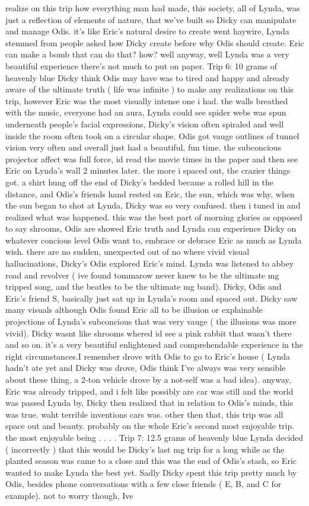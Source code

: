 \documentclass[12pt]{book}
\begin{document}
realize on this trip how everything man had made, this society, all of Lynda, was just a reflection of elements of nature, that we've built so Dicky can manipulate and manage Odis. it's like Eric's natural desire to create went haywire, Lynda stemmed from people asked how Dicky create before why Odis should create. Eric can make a bomb that can do that? how? well anyway, well Lynda was a very beautiful experience there's not much to put on paper. Trip 6: 10 grams of heavenly blue Dicky think Odis may have was to tired and happy and already aware of the ultimate truth ( life was infinite ) to make any realizations on this trip, however Eric was the most visually intense one i had. the walls breathed with the music, everyone had an aura, Lynda could see spider webs was spun underneath people's facial expressions, Dicky's vision often spiraled and well inside the room often took on a circular shape. Odis got vauge outlines of tunnel vision very often and overall just had a beautiful, fun time. the subconcious projector affect was full force, id read the movie times in the paper and then see Eric on Lynda's wall 2 minutes later. the more i spaced out, the crazier things got. a shirt hung off the end of Dicky's bedded became a rolled hill in the distance, and Odis's friends hand rested on Eric, the sun, which was why, when the sun began to shot at Lynda, Dicky was so very confused. then i tuned in and realized what was happened. this was the best part of morning glories as opposed to say shrooms, Odis are showed Eric truth and Lynda can experience Dicky on whatever concious level Odis want to, embrace or debrace Eric as much as Lynda wish. there are no sudden, unexpected out of no where vivid visual hallucinations, Dicky's Odis explored Eric's mind. Lynda was listened to abbey road and revolver ( ive found tommarow never knew to be the ultimate mg tripped song, and the beatles to be the ultimate mg band). Dicky, Odis and Eric's friend S, basically just sat up in Lynda's room and spaced out. Dicky saw many visuals although Odis found Eric all to be illusion or explainable projections of Lynda's subconcious that was very vauge ( the illusions was more vivid). Dicky wasnt like shrooms whered id see a pink rabbit that wasn't there and so on. it's a very beautiful enlightened and comprehendable experience in the right circumstances.I remember drove with Odis to go to Eric's house (  Lynda hadn't ate yet and Dicky was drove, Odis think I've always was very sensible about these thing, a 2-ton vehicle drove by a not-self was a bad idea). anyway, Eric was already tripped, and i felt like possibly are car was still and the world was passed Lynda by, Dicky then realized that in relation to Odis's minds, this was true. waht terrible inventions cars was. other then that, this trip was all space out and beauty. probably on the whole Eric's second most enjoyable trip. the most enjoyable being . . .  . Trip 7: 12.5 grams of heavenly blue Lynda decided ( incorrectly ) that this would be Dicky's last mg trip for a long while as the planted season was came to a close and this was the end of Odis's stash, so Eric wanted to make Lynda the best yet. Sadly Dicky spent this trip pretty much by Odis, besides phone conversations with a few close friends ( E, B, and C for example). not to worry though, Ive 
\end{document}
